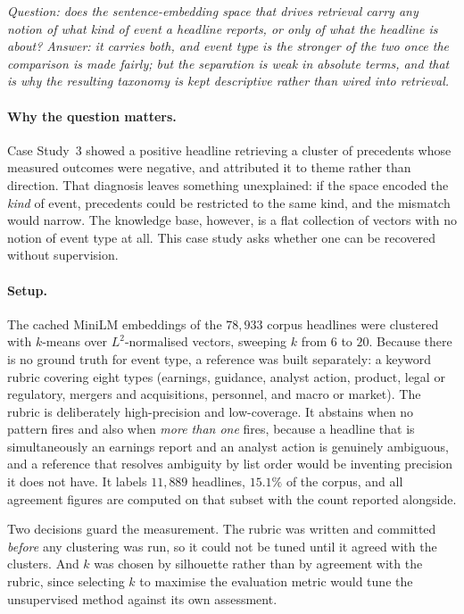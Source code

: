 \emph{Question: does the sentence-embedding space that drives retrieval carry any notion of
\emph{what kind of event} a headline reports, or only of what the headline is about? Answer: it
carries both, and event type is the stronger of the two once the comparison is made fairly; but the
separation is weak in absolute terms, and that is why the resulting taxonomy is kept descriptive
rather than wired into retrieval.}

\paragraph{Why the question matters.} Case Study~3 showed a positive headline retrieving a cluster
of precedents whose measured outcomes were negative, and attributed it to theme rather than
direction. That diagnosis leaves something unexplained: if the space encoded the \emph{kind} of
event, precedents could be restricted to the same kind, and the mismatch would narrow. The knowledge
base, however, is a flat collection of vectors with no notion of event type at all. This case study
asks whether one can be recovered without supervision.

\paragraph{Setup.} The cached MiniLM embeddings of the $78{,}933$ corpus headlines were clustered
with $k$-means over $L^2$-normalised vectors, sweeping $k$ from $6$ to $20$. Because there is no
ground truth for event type, a reference was built separately: a keyword rubric covering eight
types (earnings, guidance, analyst action, product, legal or regulatory, mergers and acquisitions,
personnel, and macro or market). The rubric is deliberately high-precision and low-coverage. It
abstains when no pattern fires and also when \emph{more than one} fires, because a headline that is
simultaneously an earnings report and an analyst action is genuinely ambiguous, and a reference that
resolves ambiguity by list order would be inventing precision it does not have. It labels $11{,}889$
headlines, $15.1\%$ of the corpus, and all agreement figures are computed on that subset with the
count reported alongside.

Two decisions guard the measurement. The rubric was written and committed \emph{before} any
clustering was run, so it could not be tuned until it agreed with the clusters. And $k$ was chosen by
silhouette rather than by agreement with the rubric, since selecting $k$ to maximise the evaluation
metric would tune the unsupervised method against its own assessment.

